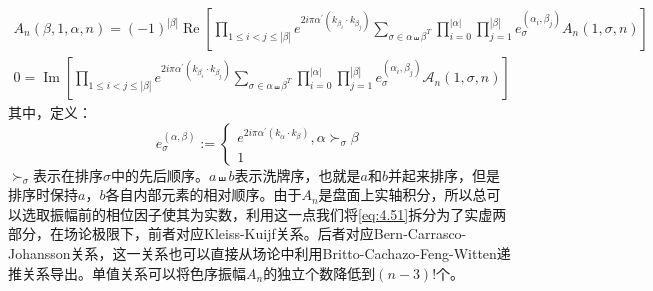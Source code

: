 \begin{equation}
	\label{eq:4.51}
\begin{gathered}
		A_n(\beta,1,\alpha,n)=(-1)^{|\beta|}\operatorname{Re}\left[\prod_{1\leq i<j\leq |\beta|}e^{2i\pi\alpha^{\prime}(k_{\beta_i}\cdot k_{\beta_j})}\sum_{\sigma\in\alpha\shuffle \beta^T}\prod_{i=0}^{|\alpha|}\prod_{j=1}^{|\beta|}e_\sigma^{(\alpha_i,\beta_j)}A_n(1,\sigma,n)\right]\\
	0=\operatorname{Im}\left[\prod_{1\leq i<j\leq |\beta|}e^{2i\pi\alpha^{\prime}(k_{\beta_i}\cdot k_{\beta_j})}\sum_{\sigma\in\alpha\shuffle \beta^T}\prod_{i=0}^{|\alpha|}\prod_{j=1}^{|\beta|}e_\sigma^{(\alpha_i,\beta_j)}\mathcal{A}_n(1,\sigma,n)\right]
\end{gathered}
\end{equation}
其中，定义：
\begin{equation}
	e^{(\alpha,\beta)}_{\sigma}:=\begin{cases} e^{2i\pi\alpha^{\prime}(k_\alpha\cdot k_\beta)},\alpha\succ_\sigma\beta\\1\end{cases}
\end{equation}
$\succ_{\sigma}$表示在排序$\sigma$中的先后顺序。$a\shuffle b$表示洗牌序，也就是$a$和$b$并起来排序，但是排序时保持$a$，$b$各自内部元素的相对顺序。由于$A_n$是盘面上实轴积分，所以总可以选取振幅前的相位因子使其为实数，利用这一点我们将\ref{eq:4.51}拆分为了实虚两部分，在场论极限下，前者对应Kleiss-Kuijf关系\cite{Kleiss:1988ne,DelDuca:1999rs}。后者对应Bern-Carrasco-Johansson关系\cite{Bern:2008qj}，这一关系也可以直接从场论中利用Britto-Cachazo-Feng-Witten递推关系\cite{Britto:2004ap,Britto:2005fq}导出\cite{Chen:2011jxa}。单值关系可以将色序振幅$A_n$的独立个数降低到$(n-3)!$个。
